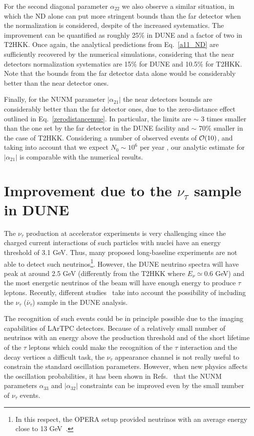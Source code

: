 \documentclass[11pt,a4paper]{article}
\begin{document}
For the second diagonal parameter $\alpha_{22}$ we also observe a similar situation, in which the ND alone can put more stringent bounds than the far detector when the normalization is considered, despite of the increased systematics. The improvement can be quantified as roughly 25\% in DUNE and a factor of two in T2HKK. Once again, the analytical predictions from Eq.~\ref{a11_ND} are sufficiently recovered by the numerical simulations, considering that the near detectors normalization systematics are 15\% for DUNE and 10.5\% for T2HKK. Note that the bounds from the far detector data alone would be considerably better than the near detector ones. 

Finally, for the NUNM parameter $|\alpha_{21}|$ the near detectors bounds are considerably better than the far detector ones, due to the zero-distance effect outlined in Eq.~\ref{zerodistancemue}. 
In particular, the limits are $\sim$ 3 times smaller than the one set by the far detector in the DUNE facility and $\sim$ 70\% smaller in the case of T2HKK. Considering a number of observed events of  ${\cal O}(10)$, and taking into account that we expect $N_0\sim10^6$ per year \cite{DUNE:2021tad}, our analytic estimate  for $|\alpha_{21}|$ is comparable with the numerical results.

\section{Improvement due to the $\nu_{\tau}$ sample in DUNE}
\label{sec:tau-analysis}

The $\nu_\tau$ production at accelerator experiments is very challenging since the charged current interactions of such particles with nuclei have an energy threshold of 3.1 GeV. Thus, many proposed long-baseline experiments are not able to detect such neutrinos\footnote{In this respect, the OPERA setup provided neutrinos with an average  energy close to 13 GeV~\cite{OPERA:2010pne}.}.
However, the DUNE neutrino spectra will have peak at around 2.5 GeV (differently from the T2HKK where $E_\nu \simeq 0.6$ GeV) and the most energetic neutrinos of the beam will have enough energy to produce $\tau$ leptons. Recently, different studies~\cite{Machado:2020yxl,Ghoshal:2019pab,DeGouvea:2019kea,Martinez-Soler:2021sir} take into account the possibility of including the $\nu_\tau$ ($\bar{\nu}_\tau$) sample in the DUNE analysis. 

The recognition of such events could be in principle possible due to the imaging capabilities of LArTPC detectors. Because of a relatively small number of neutrinos with an energy above the production threshold and of the short lifetime of the $\tau$ leptons which could make the recognition of the $\tau$ interaction and the decay vertices a difficult task, the $\nu_\tau$ appearance channel is not really useful to constrain the standard oscillation parameters. However, when new physics affects the oscillation probabilities, it has been shown in Refs.~\cite{Ghoshal:2019pab,DeGouvea:2019kea,Denton:2021mso,Denton:2021rsa} that the NUNM parameters $\alpha_{33}$ and $|\alpha_{32}|$ constraints can be improved even by the small number of $\nu_\tau$ events. 
\end{document}
